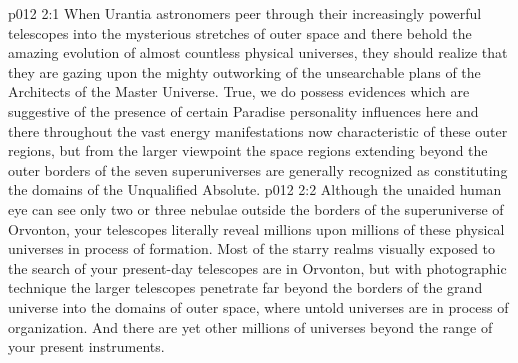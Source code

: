\vs p012 2:1 When Urantia astronomers peer through their increasingly powerful telescopes into the mysterious stretches of outer space and there behold the amazing evolution of almost countless physical universes, they should realize that they are gazing upon the mighty outworking of the unsearchable plans of the Architects of the Master Universe. True, we do possess evidences which are suggestive of the presence of certain Paradise personality influences here and there throughout the vast energy manifestations now characteristic of these outer regions, but from the larger viewpoint the space regions extending beyond the outer borders of the seven superuniverses are generally recognized as constituting the domains of the Unqualified Absolute.
\vs p012 2:2 Although the unaided human eye can see only two or three nebulae outside the borders of the superuniverse of Orvonton, your telescopes literally reveal millions upon millions of these physical universes in process of formation. Most of the starry realms visually exposed to the search of your present\hyp{}day telescopes are in Orvonton, but with photographic technique the larger telescopes penetrate far beyond the borders of the grand universe into the domains of outer space, where untold universes are in process of organization. And there are yet other millions of universes beyond the range of your present instruments.
